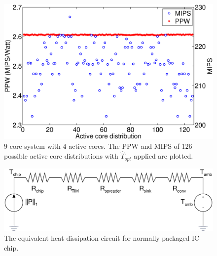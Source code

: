 \begin{figure}
  \centering
  \includegraphics[width=0.9\columnwidth]{fig/mips_ppw.eps}
  \caption{$9$-core system with $4$ active cores. The PPW and MIPS of $126$ possible active core distributions with $\hat{T}_{opt}$ applied are plotted.}
  \label{fig:mips_ppw}
\end{figure}
\begin{figure}
  \centering
  \includegraphics[width=0.8\columnwidth]{fig/resistor_line.eps}
  \caption{The equivalent heat dissipation circuit for normally
    packaged IC chip.}
  \label{fig:resistor_line}
\end{figure}
